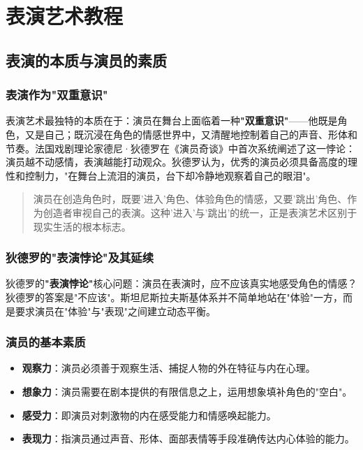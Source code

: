 \chapter{表演艺术教程}


\section{表演的本质与演员的素质}

\subsection{表演作为"双重意识"}

表演艺术最独特的本质在于：演员在舞台上面临着一种\textbf{"双重意识"}——他既是角色，又是自己；既沉浸在角色的情感世界中，又清醒地控制着自己的声音、形体和节奏。法国戏剧理论家德尼·狄德罗在《演员奇谈》中首次系统阐述了这一悖论：演员越不动感情，表演越能打动观众\cite{diderot:actor}。狄德罗认为，优秀的演员必须具备高度的理性和控制力，"在舞台上流泪的演员，台下却冷静地观察着自己的眼泪"。

\begin{quote}
演员在创造角色时，既要'进入'角色、体验角色的情感，又要'跳出'角色、作为创造者审视自己的表演。这种'进入'与'跳出'的统一，正是表演艺术区别于现实生活的根本标志。\cite{liang:acting}
\end{quote}

\subsection{狄德罗的"表演悖论"及其延续}

狄德罗的\textbf{"表演悖论"}核心问题：演员在表演时，应不应该真实地感受角色的情感？狄德罗的答案是"不应该"\cite{diderot:actor}。斯坦尼斯拉夫斯基体系并不简单地站在"体验"一方，而是要求演员在"体验"与"表现"之间建立动态平衡\cite{stanislavski:system}。

\subsection{演员的基本素质}

\begin{itemize}
    \item \textbf{观察力}：演员必须善于观察生活、捕捉人物的外在特征与内在心理。
    \item \textbf{想象力}：演员需要在剧本提供的有限信息之上，运用想象填补角色的"空白"。
    \item \textbf{感受力}：即演员对刺激物的内在感受能力和情感唤起能力。
    \item \textbf{表现力}：指演员通过声音、形体、面部表情等手段准确传达内心体验的能力。
\end{itemize}

